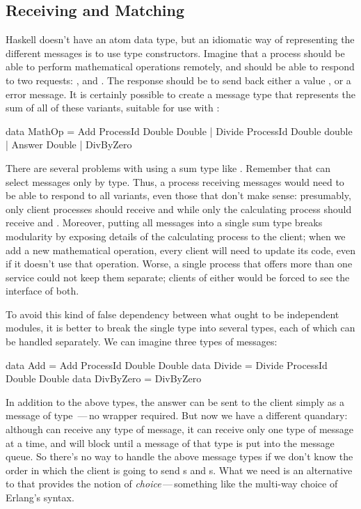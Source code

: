 \documentclass[preprint]{sigplanconf}
\begin{document}
\subsection{Receiving and Matching}

Haskell doesn't have an atom data type, but an idiomatic way of representing the different messages is to use type constructors. Imagine that a process should be able to perform mathematical operations remotely, and should be able to respond to two requests: , and . 
The response should be to send back either a value , or a  error message.
It is certainly possible to create a message type that represents the sum of all of these variants, suitable for use with :

\begin{code}
data MathOp = Add ProcessId Double Double
            | Divide ProcessId Double double
            | Answer Double
            | DivByZero
\end{code}

There are several problems with using a sum type like \mbox{.}
Remember that  can select messages only by type.
Thus, a process receiving  messages would need to be able to respond to all variants, even those that don't make sense: presumably, only client processes should receive  and  while only the calculating process should receive  and . 
Moreover, putting all messages into a single sum type breaks modularity by exposing details of the calculating process to the client; when we add a new mathematical operation, every client will need to update its code, even if it doesn't use that operation.
Worse, a single process that offers more than one service could not keep them separate; clients of either would be forced to see the interface of both.

To avoid this kind of false dependency between what ought to be independent modules, it is better to break the single  type into several types, each of which can be handled separately. 
We can imagine three types of messages:

\begin{code}
data Add = Add ProcessId Double Double
data Divide = Divide ProcessId Double Double
data DivByZero = DivByZero
\end{code}
\noindent
In addition to the above types, the answer can be sent to the client simply as a message of type \,---\,no wrapper required. 
But now we have a different quandary: although  can receive any type of message, it can receive only one type of message at a time, and will block until a message of that type is put into the message queue. 
So there's no way to handle the above message types if we don't know the order in which the client is going to send s and s. 
What we need is an alternative to  that provides the notion of {\em choice}\,---\,something like the multi-way choice of Erlang's  syntax.
 
\end{document}
